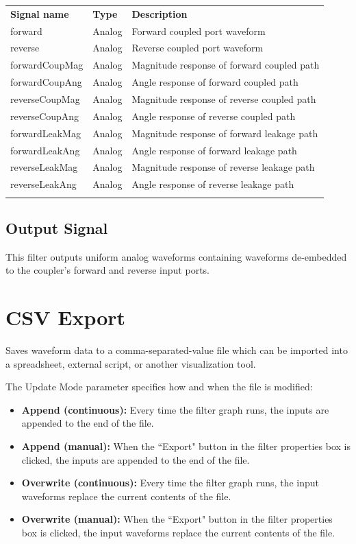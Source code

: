 \begin{tabularx}{16cm}{llX}
\thickhline
\textbf{Signal name} & \textbf{Type} & \textbf{Description} \\
\thickhline
forward & Analog & Forward coupled port waveform \\
\thinhline
reverse & Analog & Reverse coupled port waveform \\
\thinhline
forwardCoupMag & Analog & Magnitude response of forward coupled path \\
\thinhline
forwardCoupAng & Analog & Angle response of forward coupled path \\
\thinhline
reverseCoupMag & Analog & Magnitude response of reverse coupled path \\
\thinhline
reverseCoupAng & Analog & Angle response of reverse coupled path \\
\thinhline
forwardLeakMag & Analog & Magnitude response of forward leakage path \\
\thinhline
forwardLeakAng & Analog & Angle response of forward leakage path \\
\thinhline
reverseLeakMag & Analog & Magnitude response of reverse leakage path \\
\thinhline
reverseLeakAng & Analog & Angle response of reverse leakage path \\
\thickhline
\end{tabularx}

\subsection{Output Signal}

This filter outputs uniform analog waveforms containing waveforms de-embedded to the coupler's forward and reverse
input ports.

\pagebreak
\section{CSV Export}

Saves waveform data to a comma-separated-value file which can be imported into a spreadsheet, external script, or
another visualization tool.

The Update Mode parameter specifies how and when the file is modified:
\begin{itemize}
\item \textbf{Append (continuous):} Every time the filter graph runs, the inputs are appended to the end of the file.
\item \textbf{Append (manual):} When the ``Export" button in the filter properties box is clicked,
the inputs are appended to the end of the file.
\item \textbf{Overwrite (continuous):} Every time the filter graph runs, the input waveforms replace the current contents
of the file.
\item \textbf{Overwrite (manual):} When the ``Export" button in the filter properties box is clicked,
the input waveforms replace the current contents of the file.
\end{itemize}

